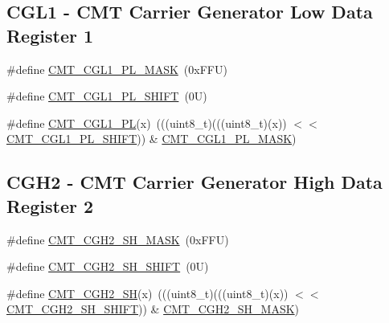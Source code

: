 \subsection*{C\+G\+L1 -\/ C\+MT Carrier Generator Low Data Register 1}
\begin{DoxyCompactItemize}
\item 
\#define \mbox{\hyperlink{group___c_m_t___register___masks_gab1d6a610e9cc0a024160f157f48a851f}{C\+M\+T\+\_\+\+C\+G\+L1\+\_\+\+P\+L\+\_\+\+M\+A\+SK}}~(0x\+F\+F\+U)
\item 
\#define \mbox{\hyperlink{group___c_m_t___register___masks_gaa7bf093c1ef1bfd7e40a2740eafb093d}{C\+M\+T\+\_\+\+C\+G\+L1\+\_\+\+P\+L\+\_\+\+S\+H\+I\+FT}}~(0\+U)
\item 
\#define \mbox{\hyperlink{group___c_m_t___register___masks_ga2d042e508373d5fceb72b794eca5e7d1}{C\+M\+T\+\_\+\+C\+G\+L1\+\_\+\+PL}}(x)~(((uint8\+\_\+t)(((uint8\+\_\+t)(x)) $<$$<$ \mbox{\hyperlink{group___c_m_t___register___masks_gaa7bf093c1ef1bfd7e40a2740eafb093d}{C\+M\+T\+\_\+\+C\+G\+L1\+\_\+\+P\+L\+\_\+\+S\+H\+I\+FT}})) \& \mbox{\hyperlink{group___c_m_t___register___masks_gab1d6a610e9cc0a024160f157f48a851f}{C\+M\+T\+\_\+\+C\+G\+L1\+\_\+\+P\+L\+\_\+\+M\+A\+SK}})
\end{DoxyCompactItemize}
\subsection*{C\+G\+H2 -\/ C\+MT Carrier Generator High Data Register 2}
\begin{DoxyCompactItemize}
\item 
\#define \mbox{\hyperlink{group___c_m_t___register___masks_ga8637e794f015ee608b47a547e35a72ea}{C\+M\+T\+\_\+\+C\+G\+H2\+\_\+\+S\+H\+\_\+\+M\+A\+SK}}~(0x\+F\+F\+U)
\item 
\#define \mbox{\hyperlink{group___c_m_t___register___masks_gafcef3256a8434ecb052c1e6fa0226459}{C\+M\+T\+\_\+\+C\+G\+H2\+\_\+\+S\+H\+\_\+\+S\+H\+I\+FT}}~(0\+U)
\item 
\#define \mbox{\hyperlink{group___c_m_t___register___masks_ga95219b8b12ea826848dec3d3287a1b7b}{C\+M\+T\+\_\+\+C\+G\+H2\+\_\+\+SH}}(x)~(((uint8\+\_\+t)(((uint8\+\_\+t)(x)) $<$$<$ \mbox{\hyperlink{group___c_m_t___register___masks_gafcef3256a8434ecb052c1e6fa0226459}{C\+M\+T\+\_\+\+C\+G\+H2\+\_\+\+S\+H\+\_\+\+S\+H\+I\+FT}})) \& \mbox{\hyperlink{group___c_m_t___register___masks_ga8637e794f015ee608b47a547e35a72ea}{C\+M\+T\+\_\+\+C\+G\+H2\+\_\+\+S\+H\+\_\+\+M\+A\+SK}})
\end{DoxyCompactItemize}
